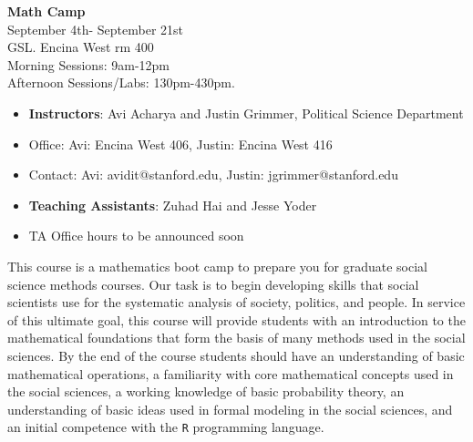 \documentclass[11pt,letterpaper]{article}
\numberwithin{equation}{section}
\begin{document}
\begin{center}
\textbf{Math Camp} \\
September 4th- September 21st\\
GSL. Encina West rm 400\\
Morning Sessions: 9am-12pm\\
Afternoon Sessions/Labs: 130pm-430pm.  
\end{center}

\begin{itemize}
\item[]\textbf{Instructors}: Avi Acharya and Justin Grimmer, Political Science Department
\item[]Office: Avi:  Encina West 406, Justin: Encina West 416
\item[]Contact: Avi: avidit@stanford.edu, Justin: jgrimmer@stanford.edu
\end{itemize}


\begin{itemize}
\item[] \textbf{Teaching Assistants}: Zuhad Hai and Jesse Yoder
\item[] TA Office hours to be announced soon
\end{itemize}



\noindent This course is a mathematics boot camp to prepare you for graduate social science methods courses.  Our task is to begin developing skills that social scientists use for the systematic analysis of society, politics, and people.  In service of this ultimate goal, this course will provide students with an introduction to the mathematical foundations that form the basis of many methods used in the social sciences. By the end of the course students should have an understanding of basic mathematical operations, a familiarity with core mathematical concepts used in the social sciences, a working knowledge of basic probability theory, an understanding of basic ideas used in formal modeling in the social sciences, and an initial competence with the {\tt R} programming language.
\end{document}
